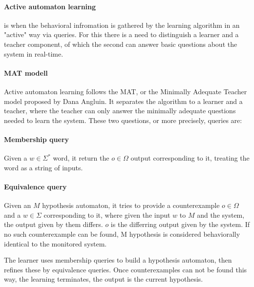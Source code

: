 \paragraph{Active automaton learning} is when the behavioral infromation is gathered by the learning algorithm in an "active" way via queries. For this there is a need to distinguish a learner and a teacher component, of which the second can answer basic questions about the system in real-time. 


\paragraph{MAT modell} Active automaton learning follows the MAT, or the Minimally Adequate Teacher model proposed by Dana Angluin\cite{ANGLUIN198787}. It separates the algorithm to a learner and a teacher, where the teacher can only answer the minimally adequate questions needed to learn the system. These two questions, or more precisely, queries are:


\paragraph{Membership query} Given a $w\in\Sigma^{*}$ word, it return the $o\in \Omega$ output corresponding to it, treating the word as a string of inputs.

\paragraph{Equivalence query} Given an $M$ hypothesis automaton, it tries to provide a counterexample $o\in\Omega$ and a $w\in\Sigma$ corresponding to it, where given the input $w$ to $M$ and the system, the output given by them differs. $o$ is the differring output given by the system. If no such counterexample can be found, M hypothesis is considered behaviorally identical to the monitored system.

\noindent The learner uses membership queries to build a hypothesis automaton, then refines these by equivalence queries. Once counterexamples can not be found this way, the learning terminates, the output is the current hypothesis.

